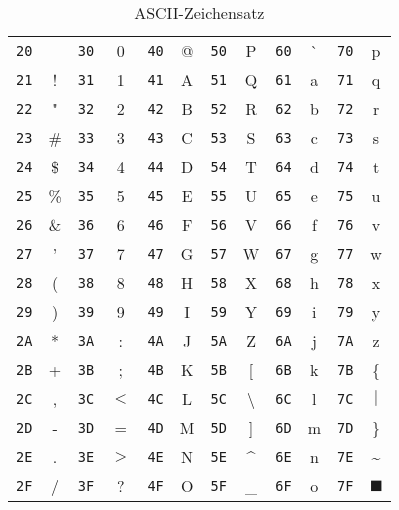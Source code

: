 \documentclass[10pt]{book}
\begin{document}
\begin{table}
\centering
\newcommand{\bs}{\textbackslash}
\begin{tabular}{ | rc | rc | rc | rc | rc | rc |}
\hline
\texttt{20} & ~    & \texttt{30} & 0    & \texttt{40} & @ &
\texttt{50} & P    & \texttt{60} & \`{} & \texttt{70} & p \\
\texttt{21} & !    & \texttt{31} & 1    & \texttt{41} & A &
\texttt{51} & Q    & \texttt{61} & a    & \texttt{71} & q \\
\texttt{22} & "    & \texttt{32} & 2    & \texttt{42} & B &
\texttt{52} & R    & \texttt{62} & b    & \texttt{72} & r \\
\texttt{23} & \#   & \texttt{33} & 3    & \texttt{43} & C &
\texttt{53} & S    & \texttt{63} & c    & \texttt{73} & s \\
\texttt{24} & \$   & \texttt{34} & 4    & \texttt{44} & D &
\texttt{54} & T    & \texttt{64} & d    & \texttt{74} & t \\
\texttt{25} & \%   & \texttt{35} & 5    & \texttt{45} & E &
\texttt{55} & U    & \texttt{65} & e    & \texttt{75} & u \\
\texttt{26} & \&   & \texttt{36} & 6    & \texttt{46} & F &
\texttt{56} & V    & \texttt{66} & f    & \texttt{76} & v \\
\texttt{27} & '    & \texttt{37} & 7    & \texttt{47} & G &
\texttt{57} & W    & \texttt{67} & g    & \texttt{77} & w \\
\texttt{28} & (    & \texttt{38} & 8    & \texttt{48} & H &
\texttt{58} & X    & \texttt{68} & h    & \texttt{78} & x \\
\texttt{29} & )    & \texttt{39} & 9    & \texttt{49} & I &
\texttt{59} & Y    & \texttt{69} & i    & \texttt{79} & y \\
\texttt{2A} & *    & \texttt{3A} & :    & \texttt{4A} & J &
\texttt{5A} & Z    & \texttt{6A} & j    & \texttt{7A} & z \\
\texttt{2B} & +    & \texttt{3B} & ;    & \texttt{4B} & K &
\texttt{5B} & [    & \texttt{6B} & k    & \texttt{7B} & \{ \\
\texttt{2C} & ,    & \texttt{3C} & $<$  & \texttt{4C} & L &
\texttt{5C} & \bs  & \texttt{6C} & l    & \texttt{7C} & $|$ \\
\texttt{2D} & -    & \texttt{3D} & =    & \texttt{4D} & M &
\texttt{5D} & ]    & \texttt{6D} & m    & \texttt{7D} & \} \\
\texttt{2E} & .    & \texttt{3E} & $>$  & \texttt{4E} & N &
\texttt{5E} & \^{} & \texttt{6E} & n    & \texttt{7E} & \textasciitilde \\
\texttt{2F} & /    & \texttt{3F} & ?    & \texttt{4F} & O &
\texttt{5F} & \_{} & \texttt{6F} & o    & \texttt{7F} & $\blacksquare$ \\
\hline
\end{tabular}
\caption{ASCII-Zeichensatz}
\label{tab:ascii}
\end{table}
\end{document}

